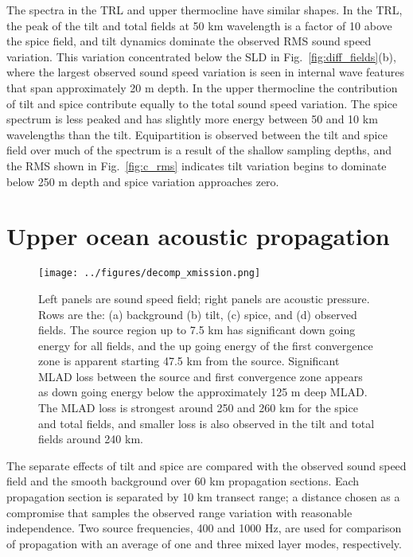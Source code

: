 \documentclass[preprint,NumberedRefs]{JASA}
\begin{document}
The spectra in the TRL and upper thermocline have similar shapes. In the TRL, the peak of the tilt and total fields at 50 km wavelength is a factor of 10 above the spice field, and tilt dynamics dominate the observed RMS sound speed variation. This variation concentrated below the SLD in Fig.~\ref{fig:diff_fields}(b), where the largest observed sound speed variation is seen in internal wave features that span approximately 20 m depth. In the upper thermocline the contribution of tilt and spice contribute equally to the total sound speed variation. The spice spectrum is less peaked and has slightly more energy between 50 and 10 km wavelengths than the tilt. Equipartition is observed between the tilt and spice field over much of the spectrum is a result of the shallow sampling depths, and the RMS shown in Fig.~\ref{fig:c_rms} indicates tilt variation begins to dominate below 250 m depth and spice variation approaches zero.

\section{\label{sec:propagation}Upper ocean acoustic propagation}
\begin{figure}
\texttt{[image: ../figures/decomp\_xmission.png]}
    \caption{\label{fig:decomp_x}{Left panels are sound speed field; right panels are acoustic pressure. Rows are the: (a) background (b) tilt, (c) spice, and (d) observed fields. The source region up to 7.5 km has significant down going energy for all fields, and the up going energy of the first convergence zone is apparent starting 47.5 km from the source. Significant MLAD loss between the source and first convergence zone appears as down going energy below the approximately 125 m deep MLAD. The MLAD loss is strongest around 250 and 260 km for the spice and total fields, and smaller loss is also observed in the tilt and total fields around 240 km.}}
\end{figure}

The separate effects of tilt and spice are compared with the observed sound speed field and the smooth background over 60 km propagation sections. Each propagation section is separated by 10 km transect range; a distance chosen as a compromise that samples the observed range variation with reasonable independence. Two source frequencies, 400 and 1000 Hz, are used for comparison of propagation with an average of one and three mixed layer modes, respectively.
\end{document}
